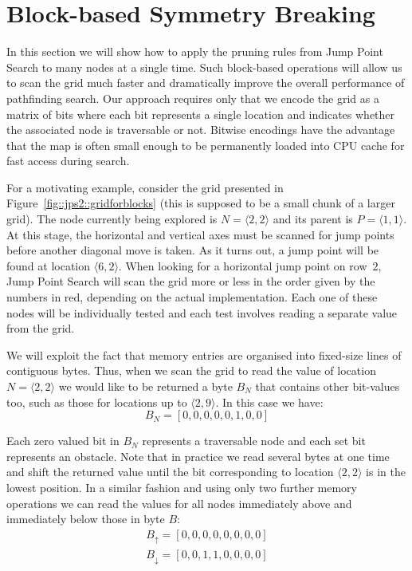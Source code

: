 \section{Block-based Symmetry Breaking}
\label{sec::blocks2}
In this section
we will show how to apply the pruning rules from Jump Point Search to many 
nodes at a single
time. Such block-based operations will allow us to scan the grid much faster
and dramatically improve the overall performance of pathfinding search.
Our approach requires only that we encode the grid as a matrix of bits where
each bit represents a single location and indicates whether the associated
node is traversable or not.
Bitwise encodings have the advantage that the map
is often small enough to be permanently loaded into CPU cache for fast 
access during search. 

For a motivating example, consider the grid presented in 
Figure~\ref{fig::jps2::gridforblocks} 
(this is supposed to be a small chunk of a larger grid).  
The node currently being explored is $N = \langle 2,2\rangle$ 
and its parent is $P = \langle 1,1\rangle$.  
At this stage, the horizontal and vertical axes must be scanned 
for jump points before another diagonal move is taken.  
As it turns out, a jump point will be found at location $\langle 6,2\rangle$.  
When looking for a horizontal jump point on row~$2$, Jump Point Search will 
scan the grid more or less in the order given by the numbers in red, 
depending on the actual implementation.  
Each one of these nodes will be individually tested and each test
involves reading a separate value from the grid.

We will exploit the fact that memory entries are organised into fixed-size 
lines of contiguous bytes. Thus, when we scan the grid to read the value of 
location $N = \langle 2, 2\rangle$ we would like to be returned a byte $B_N$
that contains other bit-values too, such as those for locations up to
$\langle 2, 9\rangle$. In this case we have:
\begin{equation}
B_{N} = [0,0,0,0,0,1,0,0]
\end{equation}



Each zero valued bit in $B_N$ represents a traversable node and each set bit
represents an obstacle.  Note that in practice we read several bytes at one
time and shift the returned value until the bit corresponding to location
$\langle 2, 2\rangle$ is in the lowest position. In a similar fashion and
using only two further memory operations we can read the values for all nodes
immediately above and immediately below those in byte $B$:
\begin{gather}
B_{\uparrow} = [0, 0, 0, 0, 0, 0, 0, 0]\\
B_{\downarrow} = [0, 0, 1, 1, 0, 0, 0, 0]
\end{gather}

